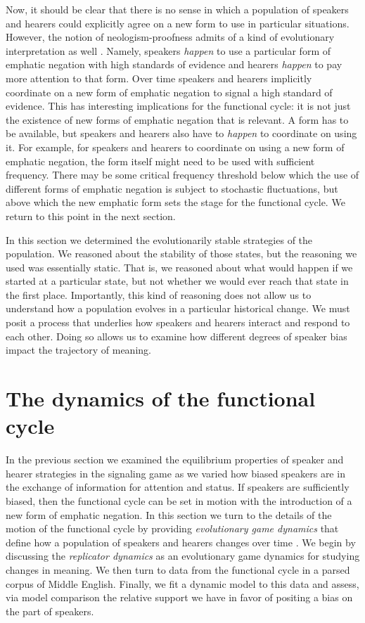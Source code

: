 \documentclass[linguex]{sp}
\theoremstyle{definition} \newtheorem{definition}{Definition}
\begin{document}
Now, it should be clear that there is no sense in which a population of speakers and hearers could explicitly agree on a new form to use in particular situations. However, the notion of neologism-proofness admits of a kind of evolutionary interpretation as well \citep[526]{farrell:1993}. Namely, speakers \emph{happen} to use a particular form of emphatic negation with high standards of evidence and hearers \emph{happen} to pay more attention to that form. Over time speakers and hearers implicitly coordinate on a new form of emphatic negation to signal a high standard of evidence. This has interesting implications for the functional cycle: it is not just the existence of new forms of emphatic negation that is relevant. A form has to be available, but speakers and hearers also have to \emph{happen} to coordinate on  using it. For example, for speakers and hearers to coordinate on using a new form of emphatic negation, the form itself might need to be used with sufficient frequency. There may be some critical frequency threshold below which the use of different forms of emphatic negation is subject to stochastic fluctuations, but above which the new emphatic form sets the stage for the functional cycle.  We return to this point in the next section.

In this section we determined the evolutionarily stable strategies of the population. We reasoned about the stability of those states, but the reasoning we used was essentially static. That is, we reasoned about what would happen if we started at a particular state, but not whether we would ever reach that state in the first place. Importantly, this kind of reasoning does not allow us to understand how a population evolves in a particular historical change. We must posit a process that underlies how speakers and hearers interact and respond to each other. Doing so allows us to examine how different degrees of speaker bias impact the trajectory of meaning. 


\section{The dynamics of the functional cycle}
\label{Dynamics}

In the previous section we examined the equilibrium properties of speaker and hearer strategies in the signaling game as we varied how biased speakers are in the exchange of information for attention and status. If speakers are sufficiently biased, then the functional cycle can be set in motion with the introduction of a new form of emphatic negation. In this section we turn to the details of the motion of the functional cycle by providing \emph{evolutionary game dynamics} that define how a population of speakers and hearers changes over time \citep{hofbauer-sigmund1998}. We begin by discussing the \emph{replicator dynamics} \citep{taylor-jonker:1978} as an evolutionary game dynamics for studying changes in meaning. We then turn to data from the functional cycle in a parsed corpus of Middle English. Finally, we fit a dynamic model to this data and assess, via model comparison the relative support we have in favor of positing a bias on  the part of speakers.
\end{document}
